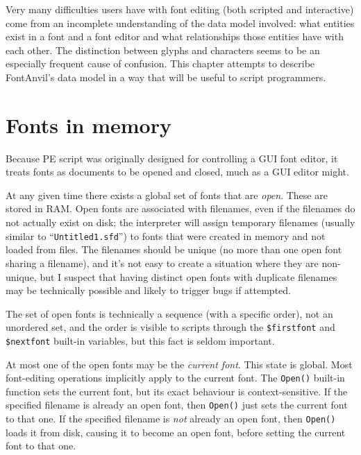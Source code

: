 \documentclass[11pt]{report}
\begin{document}
Very many difficulties users have with font editing (both scripted and
interactive) come from an incomplete understanding of the data model
involved: what entities exist in a font and a font editor and what
relationships those entities have with each other.  The distinction between
glyphs and characters seems to be an especially frequent cause of confusion. 
This chapter attempts to describe FontAnvil's data model in a way that will
be useful to script programmers.

\section{Fonts in memory}

Because PE script was originally designed for controlling a GUI font
editor, it treats fonts as documents to be opened and closed, much as
a GUI editor might.

At any given time there exists a global set of fonts that are \emph{open}. 
These are stored in RAM.  Open fonts are associated with filenames, even if
the filenames do not actually exist on disk; the interpreter will assign
temporary filenames (usually similar to ``\texttt{Untitled1.sfd}'') to fonts
that were created in memory and not loaded from files.  The filenames should
be unique (no more than one open font sharing a filename), and it's not easy
to create a situation where they are non-unique, but I suspect that having
distinct open fonts with duplicate filenames may be technically possible and
likely to trigger bugs if attempted.

The set of open fonts is technically a sequence (with a specific order), not
an unordered set, and the order is visible to scripts through the
\verb|$firstfont| and \verb|$nextfont| built-in variables, but this fact is
seldom important.

At most one of the open fonts may be the \emph{current font}.  This state is
global.  Most font-editing operations implicitly apply to the current font. 
The \texttt{Open()} built-in function sets the current font, but its exact
behaviour is context-sensitive.  If the specified filename is already an
open font, then \texttt{Open()} just sets the current font to that one.  If
the specified filename is \emph{not} already an open font, then
\texttt{Open()} loads it from disk, causing it to become an open font, before
setting the current font to that one.
\end{document}
